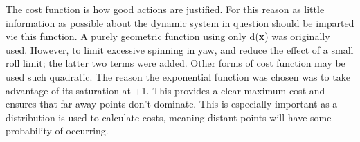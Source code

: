 \documentclass[twoside,twocolumn,12pt]{article}
\begin{document}
The cost function is how good actions are justified. For this reason as little information as possible about the dynamic system in question should be imparted vie this function. A purely geometric function using only d(\textbf{x}) was originally used. However, to limit excessive spinning in yaw, and reduce the effect of a small roll limit; the latter two terms were added.
\newline
Other forms of cost function may be used such  quadratic. The reason the exponential function was chosen was to take advantage of its saturation at +1. This provides a clear maximum cost and ensures that far away points don't dominate. This is especially important as a distribution is used to calculate costs, meaning distant points will have some probability of occurring. 
\end{document}
